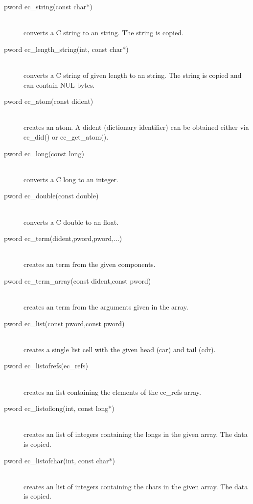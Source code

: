\begin{description}
\item[pword		ec_string(const char*)]\ \\ 
	converts a C string to an {\eclipse} string. The string is copied.

\item[pword		ec_length_string(int, const char*)]\ \\ 
	converts a C string of given length to an {\eclipse} string.
	The string is copied and can contain NUL bytes.

\item[pword		ec_atom(const dident)]\ \\
	creates an {\eclipse} atom. A dident (dictionary identifier)
	can be obtained either via ec_did() or ec_get_atom().

\item[pword		ec_long(const long)]\ \\
	converts a C long to an {\eclipse} integer.

\item[pword		ec_double(const double)]\ \\
	converts a C double to an {\eclipse} float.

\item[pword		ec_term(dident,pword,pword,...)]\ \\
	creates an {\eclipse} term from the given components.

\item[pword		ec_term_array(const dident,const pword\nil)]\ \\
	creates an {\eclipse} term from the arguments given in the array.

\item[pword		ec_list(const pword,const pword)]\ \\
	creates a single {\eclipse} list cell with the given head (car) and tail (cdr).

\item[pword		ec_listofrefs(ec_refs)]\ \\
	creates an {\eclipse} list containing the elements of the ec_refs array.

\item[pword		ec_listoflong(int, const long*)]\ \\
	creates an {\eclipse} list of integers containing the longs in the given array.
	The data is copied.

\item[pword		ec_listofchar(int, const char*)]\ \\
	creates an {\eclipse} list of integers containing the chars in the given array.
	The data is copied.


\end{description}
